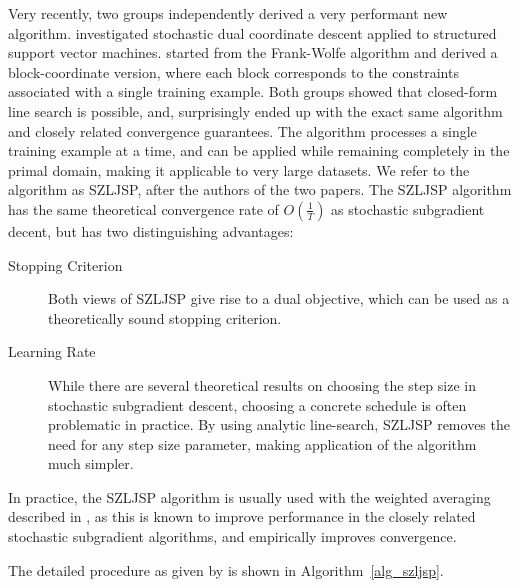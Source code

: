 Very recently, two groups independently derived a very performant new algorithm.
\citet{shalev2012proximal} investigated stochastic dual coordinate descent applied
to structured support vector machines. \citet{lacoste2012block} started from the Frank-Wolfe algorithm %
and derived a block-coordinate version, where each block corresponds to the
constraints associated with a single training example.  Both groups showed that
closed-form line search is possible, and, surprisingly ended up with the exact
same algorithm and closely related convergence guarantees.  The algorithm
processes a single training example at a time, and can be applied while
remaining completely in the primal domain, making it applicable to very large
datasets.  We refer to the algorithm as SZLJSP, after the authors of the
two papers.
%
The SZLJSP algorithm has the same theoretical convergence rate of $O(\frac{1}{T})$
as stochastic subgradient decent, but has two distinguishing advantages:
\begin{description}
\item[Stopping Criterion] Both views of SZLJSP give rise to a dual objective,
    which can be used as a theoretically sound stopping criterion.
\item[Learning Rate] While there are several theoretical results on choosing
    the step size in stochastic subgradient descent, choosing a concrete
    schedule is often problematic in practice. By using analytic line-search,
    SZLJSP removes the need for any step size parameter, making application
    of the algorithm much simpler.
\end{description}

In practice, the SZLJSP algorithm is usually used with the weighted averaging
described in , as this is known to improve performance in the
closely related stochastic subgradient algorithms, and empirically improves
convergence.

The detailed procedure as given by \citet{lacoste2012block} is shown in Algorithm~\ref{alg_szljsp}.

